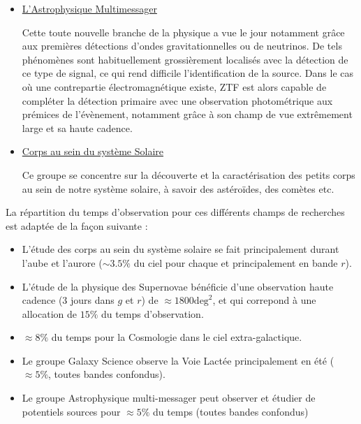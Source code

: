 \documentclass[../main/main.tex]{subfiles}
\begin{document}
\begin{itemize}[label=$\bullet$]
    \item \underline{L'Astrophysique Multimessager}

      Cette toute nouvelle branche de la physique a vue le jour notamment grâce aux
      premières détections d'ondes gravitationnelles ou de neutrinos. De
      tels phénomènes sont habituellement grossièrement localisés avec
      la détection de ce type de signal, ce qui rend difficile
      l'identification de la source. Dans le cas où une contrepartie
      électromagnétique existe, ZTF est alors capable de compléter la
      détection primaire avec une observation photométrique aux prémices de
      l'évènement, notamment grâce à son champ de vue extrêmement
      large et sa haute cadence.

    \item \underline{Corps au sein du système Solaire}

      Ce groupe se concentre sur la découverte et la caractérisation des
      petits corps au sein de notre système solaire, à savoir des
      astéroïdes, des comètes etc.
\end{itemize}

La répartition du temps d'observation pour ces différents champs de
recherches est adaptée de la façon suivante \citep{Bellm19b}:

\begin{itemize}[label=$\diamondsuit$]
  \itemsep0em 
\item L'étude des corps au sein
  du système solaire se fait principalement durant l'aube et l'aurore
  ($\sim3.5\%$ du ciel pour chaque et principalement en bande $r$).
\item L'étude de la physique des Supernovae bénéficie d'une observation
  haute cadence (3 jours dans $g$ et $r$) de $\approx1800\text{deg}^{2}$, et qui correpond à une
  allocation de $15\%$ du temps d'observation. 
\item  $\approx8\%$ du temps pour la Cosmologie dans le ciel extra-galactique.
\item Le groupe Galaxy Science observe la Voie Lactée principalement en
  été ($\approx5\%$, toutes bandes confondus).
\item Le groupe Astrophysique multi-messager peut observer et étudier de
  potentiels sources pour $\approx5\%$ du temps (toutes bandes confondus)
\end{itemize}
\end{document}
